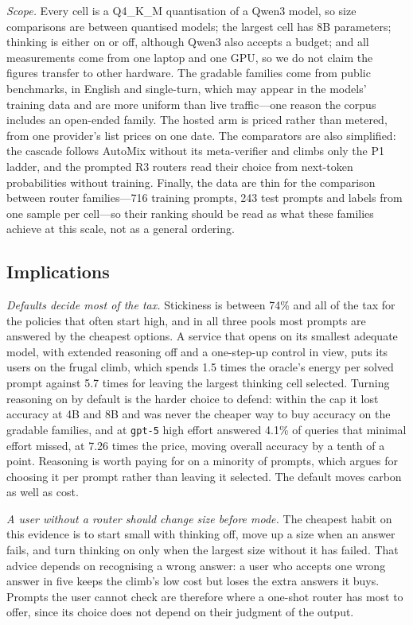 \documentclass[final,5p,times,twocolumn]{elsarticle}
\theoremstyle{plain}
\begin{document}
\emph{Scope.} Every cell is a Q4\_K\_M quantisation of a Qwen3 model, so size
comparisons are between quantised models; the largest cell has 8B parameters;
thinking is either on or off, although Qwen3 also accepts a budget; and all
measurements come from one laptop and one GPU, so we do not claim the figures
transfer to other hardware. The gradable families come from public
benchmarks, in English and single-turn, which may appear in the models'
training data and are more uniform than live traffic---one reason the corpus
includes an open-ended family. The hosted arm is priced rather than metered,
from one provider's list prices on one date. The comparators are also
simplified: the cascade follows AutoMix without its meta-verifier and climbs
only the P1 ladder, and the prompted R3 routers read their choice from
next-token probabilities without training. Finally, the data are thin for the
comparison between router families---716 training prompts, 243 test prompts
and labels from one sample per cell---so their ranking should be read as what
these families achieve at this scale, not as a general ordering.

\subsection{Implications}
\label{sec:implications}

\emph{Defaults decide most of the tax.} Stickiness is between 74\% and all of
the tax for the policies that often start high, and in all three pools most
prompts are answered by the cheapest options. A service that opens on its
smallest adequate model, with extended reasoning off and a one-step-up
control in view, puts its users on the frugal climb, which spends 1.5 times
the oracle's energy per solved prompt against 5.7 times for leaving the
largest thinking cell selected. Turning reasoning on by default is the harder
choice to defend: within the cap it lost accuracy at 4B and 8B and was never
the cheaper way to buy accuracy on the gradable families, and at
\texttt{gpt-5} high effort answered 4.1\% of queries that minimal effort
missed, at 7.26 times the price, moving overall accuracy by a tenth of a
point. Reasoning is worth paying for on a minority of prompts, which argues
for choosing it per prompt rather than leaving it selected. The default moves
carbon as well as cost.

\emph{A user without a router should change size before mode.} The cheapest
habit on this evidence is to start small with thinking off, move up a size
when an answer fails, and turn thinking on only when the largest size without
it has failed. That advice depends on recognising a wrong answer: a user who
accepts one wrong answer in five keeps the climb's low cost but loses the
extra answers it buys. Prompts the user cannot check are therefore where a
one-shot router has most to offer, since its choice does not depend on their
judgment of the output.
\end{document}

